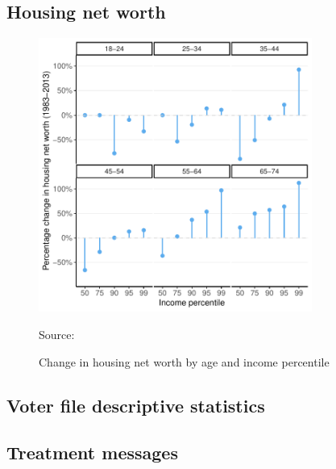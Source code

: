 \documentclass[12pt,final,fleqn]{article}
\theoremstyle{plain}
\begin{document}
\setcounter{table}{0}
\renewcommand{\thetable}{A\arabic{table}}
\setcounter{figure}{0}
\renewcommand{\thefigure}{A\arabic{figure}}
\renewcommand*{\thepage}{A\arabic{page}}

\normalsize
\newpage
\doublespace

\subsection{Housing net worth} \label{sec: theory}

\begin{figure}[H]
\begin{center}
\includegraphics[width = 0.8\textwidth]{../figs/fgA1.pdf}
\caption{Change in housing net worth by age and income percentile}
\label{fig: housing_net_worth}
\end{center}
\vspace{-0.75cm}
Source: \citet{glaeser2018economic}
\end{figure}

\clearpage
\subsection{Voter file descriptive statistics} \label{sec: vf_desc}




\subsection{Treatment messages} \label{sec: messages}
\end{document}
